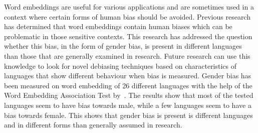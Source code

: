
Word embeddings are useful for various applications and are sometimes used in a context
where certain forms of human bias should be avoided.
Previous research has determined that word embeddings contain human
biases which can be problematic in those sensitive contexts.
This research has addressed the question whether this bias, in the form of gender
bias, is present in different languages than those that are generally examined in
research.
Future research can use this knowledge to look for novel debiasing techniques based on
characteristics of languages that show different behaviour when bias is measured.
Gender bias has been measured on word embedding of 26 different languages with the help
of the Word Embedding Association Test
by~\textcite{caliskan_2017_semantics_language_corpora}.
The results show that most of the tested languages seem to have bias towards male,
while a few languages seem to have a bias towards female.
This shows that gender bias is present is different languages and in different forms
than generally assumed in research.
